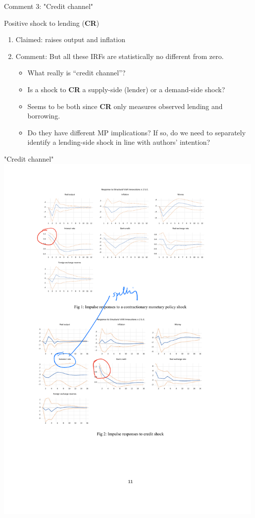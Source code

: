 \documentclass[10pt,english,slidetop,compress,
              blue,mathserif,color=option]{beamer}
\theoremstyle{plain}
\theoremstyle{definition}
\begin{document}
\begin{frame}{Comment 3: "Credit channel"}

  Positive shock to lending (\textbf{CR})
    \begin{enumerate}
        \item Claimed: raises output and inflation
        \item Comment: But all these IRFs are statistically no different from zero.
        \begin{itemize}
          \item What really is ``credit channel''? 
          \item Is a shock to \textbf{CR} a supply-side (lender) or a demand-side shock? 
          \item Seems to be both since \textbf{CR} only measures observed lending and borrowing. 
          \item Do they have different MP implications? If so, do we need to separately identify a lending-side shock in line with authors' intention?
        \end{itemize}
    \end{enumerate}  
\end{frame}

\begin{frame}{"Credit channel"}
  \includegraphics[width=0.99\textwidth]{figures/CR-shock.pdf}
\end{frame}
\end{document}

